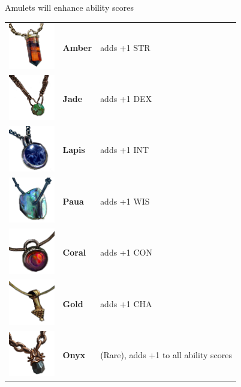 Amulets will enhance ability scores \\

\begin{tabular}{m{2cm}m{3cm}m{4cm} } 
	\includegraphics[width=2cm]{../Pictures/Gameplay/Items/Wearables/Amulets/Amber_amulet_icon.png} & \textbf{Amber} & adds +1 STR \\ 
	\includegraphics[width=2cm]{../Pictures/Gameplay/Items/Wearables/Amulets/Jade_amulet_icon.png} & \textbf{Jade} & adds +1 DEX \\ 
	\includegraphics[width=2cm]{../Pictures/Gameplay/Items/Wearables/Amulets/Lapis_amulet_icon.png} & \textbf{Lapis} & adds +1 INT \\ 
	\includegraphics[width=2cm]{../Pictures/Gameplay/Items/Wearables/Amulets/Paua_amulet_icon.png} & \textbf{Paua} & adds +1 WIS \\ 
	\includegraphics[width=2cm]{../Pictures/Gameplay/Items/Wearables/Amulets/Coral_amulet_icon.png} & \textbf{Coral} & adds +1 CON \\ 
	\includegraphics[width=2cm]{../Pictures/Gameplay/Items/Wearables/Amulets/Gold_amulet_icon.png} & \textbf{Gold} & adds +1 CHA \\ 
	\includegraphics[width=2cm]{../Pictures/Gameplay/Items/Wearables/Amulets/Onyx_amulet_icon.png} & \textbf{Onyx} & (Rare), adds +1 to all ability scores 
\end{tabular}

\clearpage